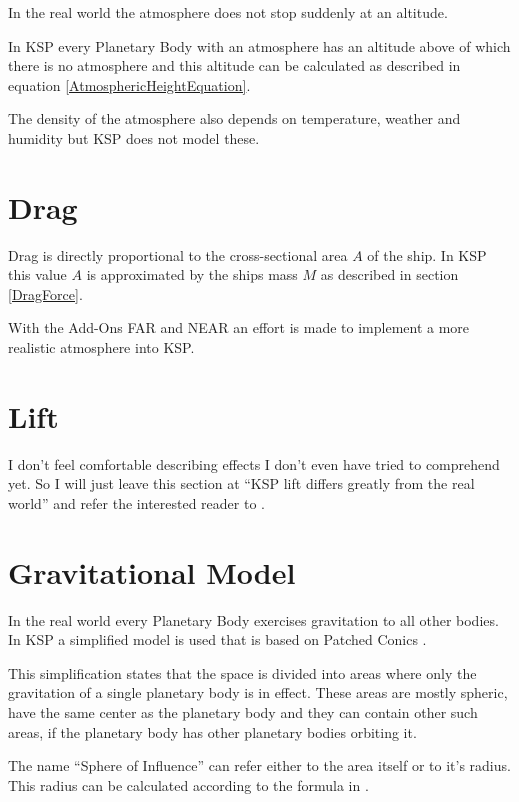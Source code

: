 \documentclass[11pt]{report}
\begin{document}
In the real world the atmosphere does not stop suddenly at an
altitude.

In KSP every Planetary Body with an atmosphere has an altitude above
of which there is no atmosphere and this altitude can be calculated as
described in equation \eqref{AtmosphericHeightEquation}.

The density of the atmosphere also depends on temperature, weather and
humidity \cite{RealDensity} but KSP does not model these.

\section{Drag}

Drag is directly proportional to the cross-sectional area $A$ of the
ship.  In KSP this value $A$ is approximated by the ships mass $M$ as
described in section \ref{DragForce}.

With the Add-Ons FAR \cite{FAR} and NEAR \cite{NEAR} an effort is made
to implement a more realistic atmosphere into KSP.

\section{Lift}

I don't feel comfortable describing effects I don't even have tried to
comprehend yet. So I will just leave this section at ``KSP lift
differs greatly from the real world'' and refer the interested reader
to \cite{FAR}.

\section{Gravitational Model}

In the real world every Planetary Body exercises gravitation to all
other bodies.  In KSP a simplified model is used that is based on
Patched Conics  \cite{PatchedConics}.

This simplification states that the space is divided into areas where
only the gravitation of a single planetary body is in effect.  These
areas are mostly spheric, have the same center as the planetary body
and they can contain other such areas, if the planetary body has other
planetary bodies orbiting it.

The name ``Sphere of Influence''  can refer
either to the area itself or to it's radius. This radius can be
calculated according to the formula in \cite{SphereOfInfluence}.
\end{document}
